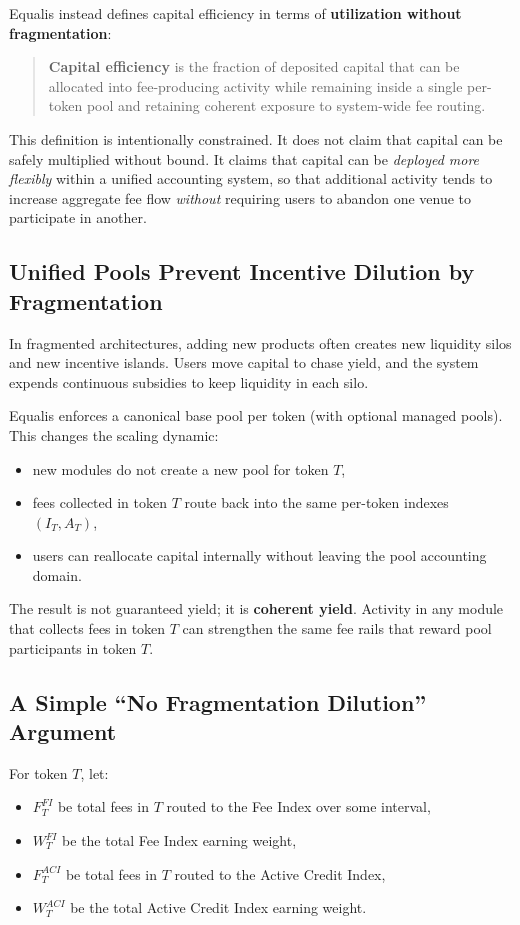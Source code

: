 \documentclass[version=preprint]{iacrcc}
\begin{document}
Equalis instead defines capital efficiency in terms of \textbf{utilization without fragmentation}:
\begin{quote}
\textbf{Capital efficiency} is the fraction of deposited capital that can be allocated into fee-producing activity while remaining inside a single per-token pool and retaining coherent exposure to system-wide fee routing.
\end{quote}

This definition is intentionally constrained. It does not claim that capital can be safely multiplied without bound. It claims that capital can be \textit{deployed more flexibly} within a unified accounting system, so that additional activity tends to increase aggregate fee flow \emph{without} requiring users to abandon one venue to participate in another.

\subsection{Unified Pools Prevent Incentive Dilution by Fragmentation}

In fragmented architectures, adding new products often creates new liquidity silos and new incentive islands. Users move capital to chase yield, and the system expends continuous subsidies to keep liquidity in each silo.

Equalis enforces a canonical base pool per token (with optional managed pools). This changes the scaling dynamic:
\begin{itemize}
  \item new modules do not create a new pool for token $T$,
  \item fees collected in token $T$ route back into the same per-token indexes $(I_T, A_T)$,
  \item users can reallocate capital internally without leaving the pool accounting domain.
\end{itemize}

The result is not guaranteed yield; it is \textbf{coherent yield}. Activity in any module that collects fees in token $T$ can strengthen the same fee rails that reward pool participants in token $T$.

\subsection{A Simple ``No Fragmentation Dilution'' Argument}

For token $T$, let:
\begin{itemize}
  \item $F^{FI}_T$ be total fees in $T$ routed to the Fee Index over some interval,
  \item $W^{FI}_T$ be the total Fee Index earning weight,
  \item $F^{ACI}_T$ be total fees in $T$ routed to the Active Credit Index,
  \item $W^{ACI}_T$ be the total Active Credit Index earning weight.
\end{itemize}
\end{document}
